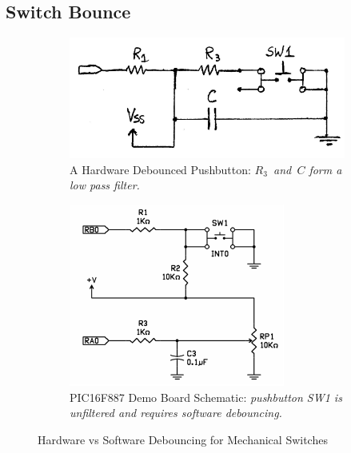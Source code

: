 \documentclass[11pt]{article}
\begin{document}
\subsection{Switch Bounce}

\begin{figure}
\centering
	\begin{subfigure}[b]{.4\textwidth}
		\centering
		\includegraphics[width=\textwidth]{Figures/filtered-pushbutton-circuit.pdf}
		\caption[]%
		{{\small A Hardware Debounced Pushbutton: \emph{\mbox{$R_{3}$ and $C$} form a low pass filter.}}}
	\end{subfigure}
	\quad
	\begin{subfigure}[b]{0.4\textwidth}
		\centering
		\includegraphics[width=\textwidth]{Figures/demo-board-pot-pushbutton-circuit.pdf}
		\caption[]%
		{{PIC16F887 Demo Board Schematic: \emph{pushbutton SW1 is unfiltered and requires software debouncing.}}}
	\end{subfigure}	
	\caption{Hardware vs Software Debouncing for Mechanical Switches}
	\label{io-circuit-diagram}
\end{figure}
\end{document}
